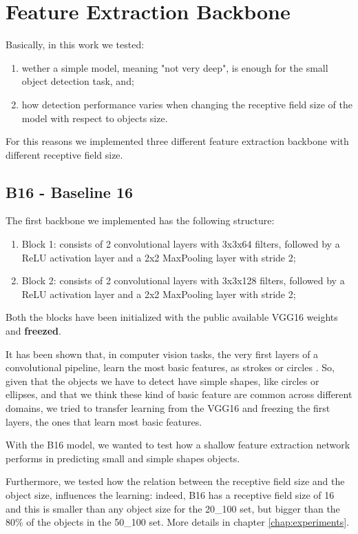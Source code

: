 \documentclass[a4paper,10pt]{report}
\begin{document}
\section{Feature Extraction Backbone}\label{sec:feature-extraction-backbone}
Basically, in this work we tested:
\begin{enumerate}
\item wether a simple model, meaning "not very deep", is enough for the small object detection task, and;
\item how detection performance varies when changing the receptive field size of the model with respect to objects size.
\end{enumerate}

For this reasons we implemented three different feature extraction backbone with different receptive field size.

\subsection{B16 - Baseline 16}\label{subsec:b16}

The first backbone we implemented has the following structure:
\begin{enumerate}
  \item Block 1: consists of 2 convolutional layers with 3x3x64 filters, followed by a ReLU activation layer and a 2x2 MaxPooling layer with stride 2;
  \item Block 2: consists of 2 convolutional layers with 3x3x128 filters, followed by a ReLU activation layer and a 2x2 MaxPooling layer with stride 2;
\end{enumerate}
Both the blocks have been initialized with the public available VGG16 weights and \textbf{freezed}.

It has been shown that, in computer vision tasks, the very first layers of a convolutional pipeline, learn the most basic features, as strokes or circles \cite{cnn-features}.
So, given that the objects we have to detect have simple shapes, like circles or ellipses, and that we think these kind of basic feature are common across different domains, 
we tried to transfer learning from the VGG16 and freezing the first layers, the ones that learn most basic features.

With the B16 model, we wanted to test how a shallow feature extraction network performs in predicting small and simple shapes objects.

Furthermore, we tested how the relation between the receptive field size and the object size, influences the learning: indeed, B16 has a receptive field size of 16 and this is smaller than any object size for the 20\_100 set, but bigger than the 80\% of the objects in the 50\_100 set. More details in chapter \ref{chap:experiments}.
\end{document}
